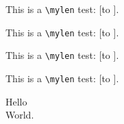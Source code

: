 \documentclass{revtex4-1}
\begin{document}
\newlength{\mylen}
\setlength{\mylen}{1cm plus 1cm minus 1cm} %
This is a \verb+\mylen+ test: [\hbox to ]. %

\setlength{\mylen}{1cm plus 2cm plus 3cm} %
This is a \verb+\mylen+ test: [\hbox to ].

\setlength{\mylen}{1cm minus 2mm plus 3mm} %
This is a \verb+\mylen+ test: [\hbox to ].

\setlength{\mylen}{1cm plus 0.02\textwidth minus 0.01\textwidth} %
This is a \verb+\mylen+ test: [\hbox to ].

Hello\\[1mm plus 1cm] World.
\end{document}
